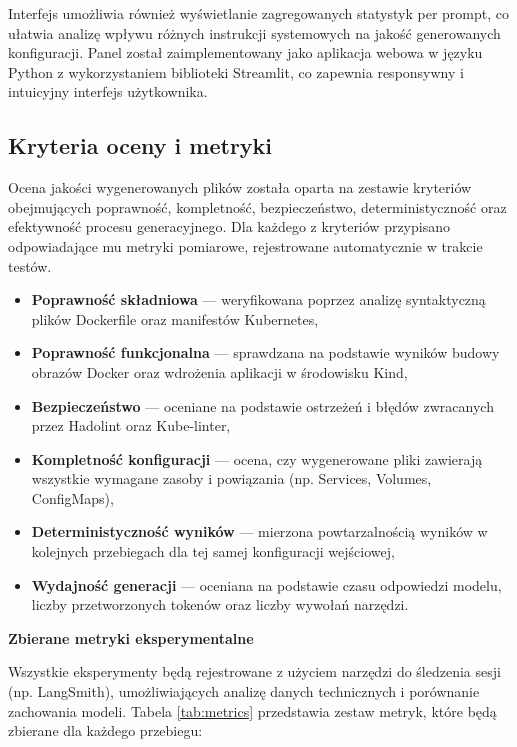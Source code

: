 Interfejs umożliwia również wyświetlanie zagregowanych statystyk per prompt, co ułatwia analizę wpływu różnych instrukcji systemowych na jakość generowanych konfiguracji. Panel został zaimplementowany jako aplikacja webowa w języku Python z wykorzystaniem biblioteki Streamlit, co zapewnia responsywny i intuicyjny interfejs użytkownika.

\subsection{Kryteria oceny i metryki}

Ocena jakości wygenerowanych plików została oparta na zestawie kryteriów obejmujących poprawność, kompletność, bezpieczeństwo, deterministyczność oraz efektywność procesu generacyjnego. Dla każdego z kryteriów przypisano odpowiadające mu metryki pomiarowe, rejestrowane automatycznie w trakcie testów.

\begin{itemize}
    \item \textbf{Poprawność składniowa} — weryfikowana poprzez analizę syntaktyczną plików Dockerfile oraz manifestów Kubernetes,
    \item \textbf{Poprawność funkcjonalna} — sprawdzana na podstawie wyników budowy obrazów Docker oraz wdrożenia aplikacji w środowisku Kind,
    \item \textbf{Bezpieczeństwo} — oceniane na podstawie ostrzeżeń i błędów zwracanych przez Hadolint oraz Kube-linter,
    \item \textbf{Kompletność konfiguracji} — ocena, czy wygenerowane pliki zawierają wszystkie wymagane zasoby i powiązania (np. Services, Volumes, ConfigMaps),
    \item \textbf{Deterministyczność wyników} — mierzona powtarzalnością wyników w kolejnych przebiegach dla tej samej konfiguracji wejściowej,
    \item \textbf{Wydajność generacji} — oceniana na podstawie czasu odpowiedzi modelu, liczby przetworzonych tokenów oraz liczby wywołań narzędzi.
\end{itemize}

\bigskip
\noindent
\textbf{Zbierane metryki eksperymentalne}

Wszystkie eksperymenty będą rejestrowane z użyciem narzędzi do śledzenia sesji (np. LangSmith), umożliwiających analizę danych technicznych i porównanie zachowania modeli. Tabela \ref{tab:metrics} przedstawia zestaw metryk, które będą zbierane dla każdego przebiegu:

